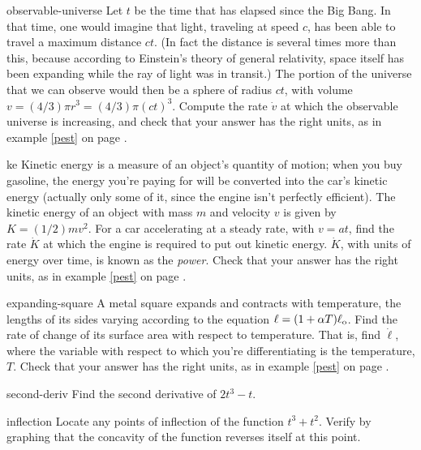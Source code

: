 \begin{hwsection}
\begin{hwwithsoln}{observable-universe}
Let $t$ be the time that has elapsed since the Big Bang. In that time, one would imagine that light, traveling at speed
$c$, has been able to travel a maximum distance $ct$. (In fact the distance is several times more than this, because
according to Einstein's theory of general relativity, space itself has been expanding while the ray of light was
in transit.) The portion of the universe that we can observe
would then be a sphere of radius $ct$, with volume $v=(4/3)\pi r^3=(4/3)\pi(ct)^3$. Compute the rate
$\dot{v}$ at which the observable universe is increasing, and check that your answer has the right units,
as in example \ref{pest} on page \pageref{pest}.
\end{hwwithsoln}

\begin{hwwithsoln}{ke}
Kinetic energy is a measure of an object's quantity of motion; when you buy gasoline,  the
energy you're paying for will be converted into the car's kinetic energy (actually only some of
it, since the engine isn't perfectly efficient). The kinetic energy of an object with mass
$m$ and velocity $v$ is given by $K=(1/2)mv^2$. For a car accelerating at a steady rate, with
$v=at$, find the rate $\dot{K}$ at which the engine is required to put out kinetic energy.
$\dot{K}$, with units of energy over time, is known as the \emph{power}.
Check that your answer has the right units, as in example \ref{pest} on page \pageref{pest}.
\end{hwwithsoln}

\begin{hwwithsoln}{expanding-square}
A metal square expands and contracts with temperature, the lengths of its sides varying according to the
equation $\ell=(1+\alpha T)\ell_{\textup{o}}$. Find the rate of change of its surface area with respect to
temperature. That is, find $\dot{\ell}$, where the variable with respect to which you're differentiating
is the temperature, $T$.  
Check that your answer has the right units, as in example \ref{pest} on page \pageref{pest}.
\end{hwwithsoln}

\begin{hwwithsoln}{second-deriv}
Find the second derivative of $2t^3-t$.
\end{hwwithsoln}

\begin{hwwithsoln}{inflection}
Locate any points of inflection of the function $t^3+t^2$. Verify by graphing that the concavity
of the function reverses itself at this point.
\end{hwwithsoln}


\end{hwsection}
